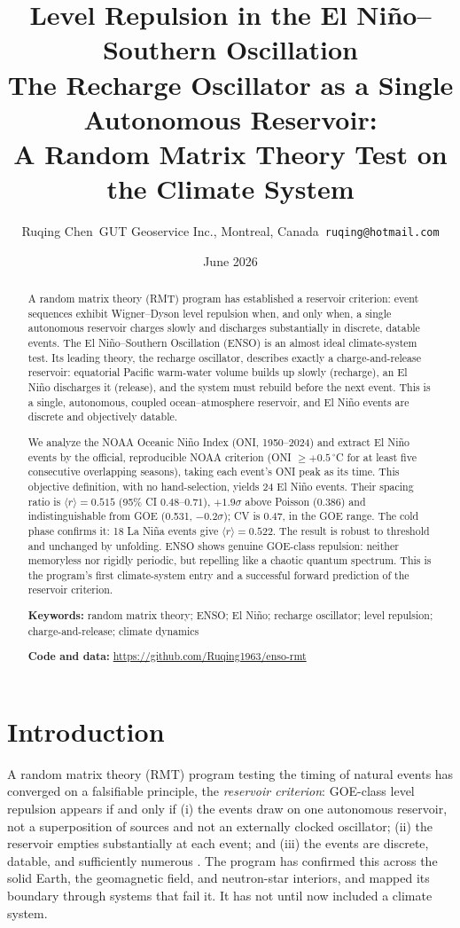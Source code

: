 \documentclass[12pt,a4paper]{article}
\title{\textbf{Level Repulsion in the El Ni\~no--Southern Oscillation}\\[0.4em]
{\large The Recharge Oscillator as a Single Autonomous Reservoir:}\\
{\large A Random Matrix Theory Test on the Climate System}}
\author{Ruqing Chen\ GUT Geoservice Inc., Montreal, Canada\ \texttt{ruqing@hotmail.com}}
\date{June 2026}
\begin{document}
\maketitle
\begin{abstract}

\noindent A random matrix theory (RMT) program has established a reservoir criterion: event sequences exhibit Wigner--Dyson level repulsion when, and only when, a single autonomous reservoir charges slowly and discharges substantially in discrete, datable events. The El Ni\~no--Southern Oscillation (ENSO) is an almost ideal climate-system test. Its leading theory, the recharge oscillator, describes exactly a charge-and-release reservoir: equatorial Pacific warm-water volume builds up slowly (recharge), an El Ni\~no discharges it (release), and the system must rebuild before the next event. This is a single, autonomous, coupled ocean--atmosphere reservoir, and El Ni\~no events are discrete and objectively datable.


\noindent We analyze the NOAA Oceanic Ni\~no Index (ONI, 1950--2024) and extract El Ni\~no events by the official, reproducible NOAA criterion (ONI $\ge +0.5\,^\circ$C for at least five consecutive overlapping seasons), taking each event's ONI peak as its time. This objective definition, with no hand-selection, yields 24 El Ni\~no events. Their spacing ratio is $\langle r\rangle = 0.515$ (95\% CI $0.48$--$0.71$), $+1.9\sigma$ above Poisson (0.386) and indistinguishable from GOE (0.531, $-0.2\sigma$); CV is $0.47$, in the GOE range. The cold phase confirms it: 18 La Ni\~na events give $\langle r\rangle = 0.522$. The result is robust to threshold and unchanged by unfolding. ENSO shows genuine GOE-class repulsion: neither memoryless nor rigidly periodic, but repelling like a chaotic quantum spectrum. This is the program's first climate-system entry and a successful forward prediction of the reservoir criterion.

\vspace{0.6em}

\noindent\textbf{Keywords:} random matrix theory; ENSO; El Ni\~no; recharge oscillator; level repulsion; charge-and-release; climate dynamics
\vspace{0.3em}

\noindent\textbf{Code and data:} \url{https://github.com/Ruqing1963/enso-rmt}
\end{abstract}
\section{Introduction}
A random matrix theory (RMT) program testing the timing of natural events has converged on a falsifiable principle, the \emph{reservoir criterion}: GOE-class level repulsion appears if and only if (i) the events draw on one autonomous reservoir, not a superposition of sources and not an externally clocked oscillator; (ii) the reservoir empties substantially at each event; and (iii) the events are discrete, datable, and sufficiently numerous \citep{chen2026plumes,chen2026pulsar}. The program has confirmed this across the solid Earth, the geomagnetic field, and neutron-star interiors, and mapped its boundary through systems that fail it. It has not until now included a climate system.
\end{document}
